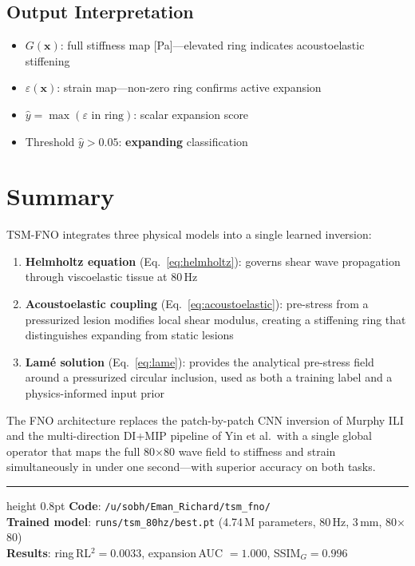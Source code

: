 \documentclass[11pt,letterpaper]{article}
\newcommand{\xvec}{\bm{x}}
\begin{document}
\subsection{Output Interpretation}

\begin{itemize}[leftmargin=2em]
    \item $G(\xvec)$: full stiffness map [Pa]---elevated ring indicates acoustoelastic stiffening
    \item $\varepsilon(\xvec)$: strain map---non-zero ring confirms active expansion
    \item $\hat{y} = \max(\varepsilon \text{ in ring})$: scalar expansion score
    \item Threshold $\hat{y} > 0.05$: \textbf{expanding} classification
\end{itemize}

\section{Summary}

TSM-FNO integrates three physical models into a single learned inversion:

\begin{enumerate}[leftmargin=2em]
    \item \textbf{Helmholtz equation} (Eq.~\ref{eq:helmholtz}): governs shear wave
          propagation through viscoelastic tissue at 80\,Hz
    \item \textbf{Acoustoelastic coupling} (Eq.~\ref{eq:acoustoelastic}):
          pre-stress from a pressurized lesion modifies local shear modulus,
          creating a stiffening ring that distinguishes expanding from static lesions
    \item \textbf{Lam\'{e} solution} (Eq.~\ref{eq:lame}): provides the analytical
          pre-stress field around a pressurized circular inclusion, used as both
          a training label and a physics-informed input prior
\end{enumerate}

The FNO architecture replaces the patch-by-patch CNN inversion of Murphy ILI and
the multi-direction DI+MIP pipeline of Yin et al.\ with a single global operator
that maps the full 80$\times$80 wave field to stiffness and strain simultaneously
in under one second---with superior accuracy on both tasks.

\vspace{12pt}
\hrule height 0.8pt
\vspace{6pt}
{\small
\textbf{Code}: \texttt{/u/sobh/Eman\_Richard/tsm\_fno/} \\
\textbf{Trained model}: \texttt{runs/tsm\_80hz/best.pt} \quad (4.74\,M parameters, 80\,Hz, 3\,mm, 80$\times$80) \\
\textbf{Results}: ring\,RL$^2 = 0.0033$, expansion\,AUC $= 1.000$, SSIM$_G = 0.996$
}
\end{document}
